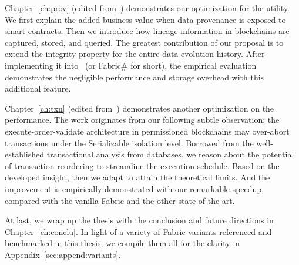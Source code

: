 Chapter~\ref{ch:prov} (edited from~\cite{ruan2019fine}) demonstrates our optimization for the utility. 
We first explain the added business value when data provenance is exposed to smart contracts. 
Then we introduce how lineage information in blockchains are captured, stored, and queried. 
The greatest contribution of our proposal is to extend the integrity property for the entire data evolution history. 
After implementing it into {\fs}~(or Fabric\# for short), the empirical evaluation demonstrates the negligible performance and storage overhead with this additional feature. 

Chapter~\ref{ch:txn} (edited from~\cite{ruan2020transactional}) demonstrates another optimization on the performance. 
The work originates from our following subtle observation:
the execute-order-validate architecture in permissioned blockchains may over-abort transactions under the Serializable isolation level. 
Borrowed from the well-established transactional analysis from databases, we reason about the potential of transaction reordering to streamline the execution schedule. Based on the developed insight, then we adapt {\fs} to attain the theoretical limits. 
And the improvement is empirically demonstrated with our remarkable speedup, compared with the vanilla Fabric and the other state-of-the-art. 

At last, we wrap up the thesis with the conclusion and future directions in Chapter~\ref{ch:conclu}. 
In light of a variety of Fabric variants referenced and benchmarked in this thesis, we compile them all for the clarity in Appendix~\ref{sec:append:variants}. 

